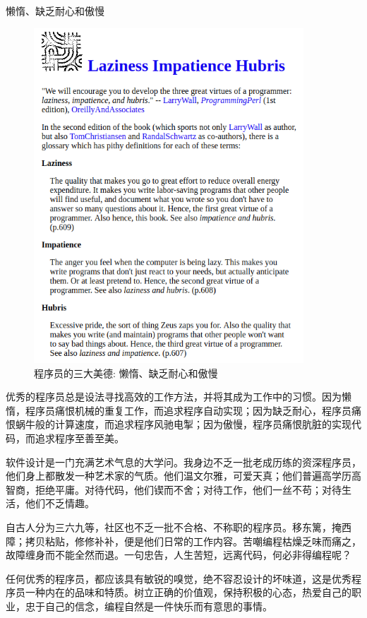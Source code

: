 \begin{content}
\begin{episode}{懒惰、缺乏耐心和傲慢}
\begin{content}
\begin{figure}[H]
\centering
\includegraphics[width=0.9\textwidth]{figures/xunit/larry-wall.png}
\caption{程序员的三大美德: 懒惰、缺乏耐心和傲慢}
 \label{fig:larry-wall}
\end{figure}

优秀的程序员总是设法寻找高效的工作方法，并将其成为工作中的习惯。因为懒惰，程序员痛恨机械的重复工作，而追求程序自动实现；因为缺乏耐心，程序员痛恨蜗牛般的计算速度，而追求程序风驰电掣；因为傲慢，程序员痛恨肮脏的实现代码，而追求程序至善至美。

软件设计是一门充满艺术气息的大学问。我身边不乏一批老成历练的资深程序员，他们身上都散发一种艺术家的气质。他们温文尔雅，可爱天真；他们普遍高学历高智商，拒绝平庸。对待代码，他们锲而不舍；对待工作，他们一丝不苟；对待生活，他们不乏情趣。

自古人分为三六九等，社区也不乏一批不合格、不称职的程序员。移东篱，掩西障；拷贝粘贴，修修补补，便是他们日常的工作内容。苦嘲编程枯燥乏味而痛之，故障缠身而不能全然而退。一句忠告，人生苦短，远离代码，何必非得编程呢？

任何优秀的程序员，都应该具有敏锐的嗅觉，绝不容忍设计的坏味道，这是优秀程序员一种内在的品味和特质。树立正确的价值观，保持积极的心态，热爱自己的职业，忠于自己的信念，编程自然是一件快乐而有意思的事情。


\end{content}
\end{episode}
\end{content}
